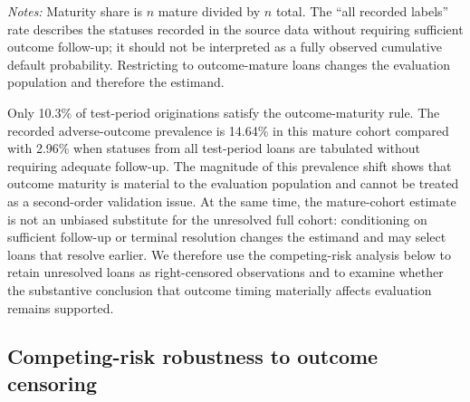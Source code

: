 \documentclass[10pt]{article}
\begin{document}
\begin{table}[!ht]
\centering
\caption{Outcome maturity and prevalence by chronological split. The all-label rate treats every recorded label as observed; the mature rate restricts evaluation to loans meeting the outcome-maturity rule.}
\label{tab:maturity}

\vspace{3pt}
{\footnotesize \textit{Notes:} Maturity share is $n$ mature divided by $n$ total. The ``all recorded labels'' rate describes the statuses recorded in the source data without requiring sufficient outcome follow-up; it should not be interpreted as a fully observed cumulative default probability. Restricting to outcome-mature loans changes the evaluation population and therefore the estimand.}
\end{table}

Only 10.3\% of test-period originations satisfy the outcome-maturity rule. The recorded adverse-outcome prevalence is 14.64\% in this mature cohort compared with 2.96\% when statuses from all test-period loans are tabulated without requiring adequate follow-up. The magnitude of this prevalence shift shows that outcome maturity is material to the evaluation population and cannot be treated as a second-order validation issue. At the same time, the mature-cohort estimate is not an unbiased substitute for the unresolved full cohort: conditioning on sufficient follow-up or terminal resolution changes the estimand and may select loans that resolve earlier. We therefore use the competing-risk analysis below to retain unresolved loans as right-censored observations and to examine whether the substantive conclusion that outcome timing materially affects evaluation remains supported.

\subsection{Competing-risk robustness to outcome censoring}
\end{document}
